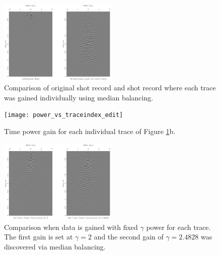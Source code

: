 \documentclass{segabs}
\begin{document}
\begin{figure}[h]
    \centering
    \includegraphics[width=0.5\textwidth]{individual_gain_data_by_trace_time_sidebyside.pdf}
    \caption{Comparison of original shot record and shot record where each trace was gained individually using median balancing.}
    \label{fig:shot_individual_gained}
\end{figure}

\begin{figure}[h]
    \centering
    \texttt{[image: power\_vs\_traceindex\_edit]}
    \caption{Time power gain for each individual trace of Figure \ref{fig:shot_individual_gained}b.}
    \label{fig:power_vs_traceindex}
\end{figure}

\begin{figure}[h]
    \centering
    \includegraphics[width=0.5\textwidth]{original_data_sidebyside.pdf}
    \caption{Comparison when data is gained with fixed $\gamma$ power for each trace. The first gain is set at $\gamma=2$ and the second gain of $\gamma=2.4828$ was discovered via median balancing. }
    \label{fig:shot_family_gained}
\end{figure}



\end{document}
